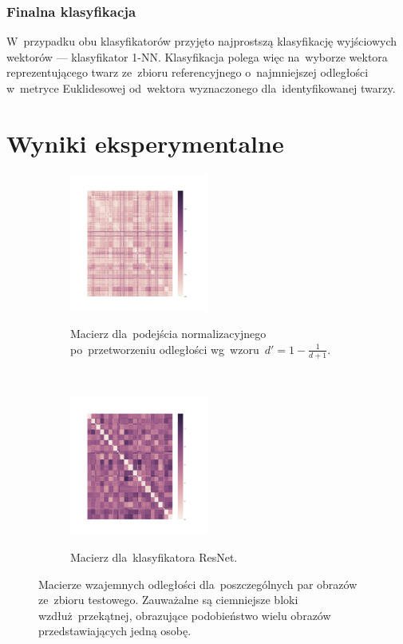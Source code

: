 \documentclass[11pt,a4paper]{article}
\begin{document}
\subsubsection{Finalna klasyfikacja}

W~przypadku obu klasyfikatorów przyjęto najprostszą klasyfikację wyjściowych wektorów --- klasyfikator 1-NN.
Klasyfikacja polega więc na~wyborze wektora reprezentującego twarz ze~zbioru referencyjnego o~najmniejszej odległości w~metryce Euklidesowej od~wektora wyznaczonego dla~identyfikowanej twarzy.

\section{Wyniki eksperymentalne}
\label{sec:results}

\begin{figure}[H]
    \begin{subfigure}{\textwidth}
        \centering
        \includegraphics[width=0.5\textwidth]{res/img/normalized_distance_matrix.png}
        \label{subfig:normalized-distance-matrix}
        \caption{Macierz dla~podejścia normalizacyjnego po~przetworzeniu odległości wg~wzoru~$d' = 1 - \frac{1}{d + 1}$.}
    \end{subfigure}
    \\
    \begin{subfigure}{\textwidth}
        \centering
        \includegraphics[width=0.5\textwidth]{res/img/resnet_distance_matrix.png}
        \label{subfig:resnet-distance-matrix}
        \caption{Macierz dla~klasyfikatora ResNet.}
    \end{subfigure}
    \caption{Macierze wzajemnych odległości dla~poszczególnych par obrazów ze~zbioru testowego.
    Zauważalne są ciemniejsze bloki wzdłuż~przekątnej, obrazujące podobieństwo wielu obrazów przedstawiających jedną osobę.}
\end{figure}
\end{document}
